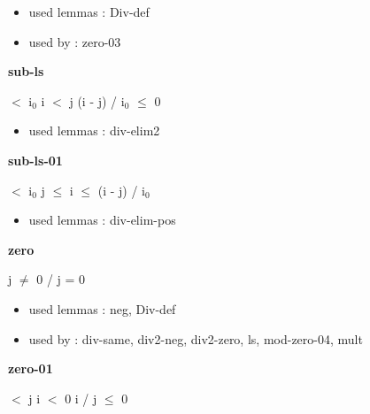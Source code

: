 \documentclass[a4paper]{article}
\begin{document}
\begin{itemize}


\item       used lemmas  : Div-def
\item       used by      : zero-03

\end{itemize}

\medskip

\bigskip

{\large\bf sub-ls}

\medskip

  $<$ $\mbox{i}_{0}$ \And i $<$ j \Imp (i - j) / $\mbox{i}_{0}$ $\le$ 0

\begin{itemize}


\item       used lemmas  : div-elim2

\end{itemize}

\medskip

\bigskip

{\large\bf sub-ls-01}

\medskip

  $<$ $\mbox{i}_{0}$ \And j $\le$ i  $\le$ (i - j) / $\mbox{i}_{0}$

\begin{itemize}


\item       used lemmas  : div-elim-pos

\end{itemize}

\medskip

\bigskip

{\large\bf zero}

\medskip

j $\neq$ 0  / j = 0

\begin{itemize}


\item       used lemmas  : neg, Div-def
\item       used by      : div-same, div2-neg, div2-zero, ls, mod-zero-04, mult

\end{itemize}

\medskip

\bigskip

{\large\bf zero-01}

\medskip

  $<$ j \And i $<$ 0 \Imp i / j $\le$ 0
\end{document}
